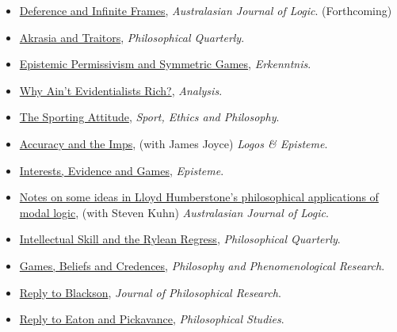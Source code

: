 \documentclass[
  10pt,
  letterpaper,
  DIV=11,
  numbers=noendperiod,
  twoside]{scrartcl}
\providecommand{\tightlist}{%
  \setlength{\itemsep}{0pt}\setlength{\parskip}{0pt}}
\begin{document}
\begin{itemize}
\tightlist
\item
  \href{https://brian.weatherson.org/quarto/posts/defer-infinite/defer-infinite.html}{Deference
  and Infinite Frames}, \emph{Australasian Journal of Logic}.
  (Forthcoming)
\item
  \href{https://brian.weatherson.org/quarto/posts/reply-luzon/reply-luzon.html}{Akrasia
  and Traitors}, \emph{Philosophical Quarterly}.
\item
  \href{https://brian.weatherson.org/quarto/posts/symmetric-permissivism/permissivism-and-symmetric-games.html}{Epistemic
  Permissivism and Symmetric Games}, \emph{Erkenntnis}.
\item
  \href{https://brian.weatherson.org/quarto/posts/war-on-war/war-on-war.html}{Why
  Ain't Evidentialists Rich?}, \emph{Analysis}.
\item
  \href{https://brian.weatherson.org/quarto/posts/borge/the-sporting-attitude.html}{The
  Sporting Attitude}, \emph{Sport, Ethics and Philosophy}.
\item
  \href{https://brian.weatherson.org/quarto/posts/imps/accuracy-and-the-imps.html}{Accuracy
  and the Imps}, (with James Joyce) \emph{Logos \& Episteme}.
\item
  \href{https://brian.weatherson.org/quarto/posts/ieg/interests-evidence-and-games.html}{Interests,
  Evidence and Games}, \emph{Episteme}.
\item
  \href{https://brian.weatherson.org/quarto/posts/humberstone-modal/notes-on-some-ideas-in-lloyd-humberstones-philosophical-applications-of-modal-logic.html}{Notes
  on some ideas in Lloyd Humberstone's philosophical applications of
  modal logic}, (with Steven Kuhn) \emph{Australasian Journal of Logic}.
\item
  \href{https://brian.weatherson.org/quarto/posts/ryle-regress/ryle-regress.html}{Intellectual
  Skill and the Rylean Regress}, \emph{Philosophical Quarterly}.
\item
  \href{https://brian.weatherson.org/quarto/posts/gbc/games-beliefs-and-credences.html}{Games,
  Beliefs and Credences}, \emph{Philosophy and Phenomenological
  Research}.
\item
  \href{https://brian.weatherson.org/quarto/posts/reply-blackson/reply-to-blackson.html}{Reply
  to Blackson}, \emph{Journal of Philosophical Research}.
\item
  \href{https://brian.weatherson.org/quarto/posts/reply-eaton-pickavance/reply-to-eaton-and-pickavance.html}{Reply
  to Eaton and Pickavance}, \emph{Philosophical Studies}.

\end{itemize}
\end{document}
